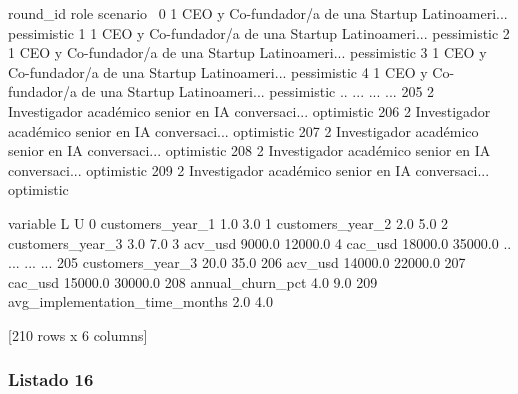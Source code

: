 \begin{APACode}
     round_id                                               role     scenario  \
0           1  CEO y Co-fundador/a de una Startup Latinoameri...  pessimistic   
1           1  CEO y Co-fundador/a de una Startup Latinoameri...  pessimistic   
2           1  CEO y Co-fundador/a de una Startup Latinoameri...  pessimistic   
3           1  CEO y Co-fundador/a de una Startup Latinoameri...  pessimistic   
4           1  CEO y Co-fundador/a de una Startup Latinoameri...  pessimistic   
..        ...                                                ...          ...   
205         2  Investigador académico senior en IA conversaci...   optimistic   
206         2  Investigador académico senior en IA conversaci...   optimistic   
207         2  Investigador académico senior en IA conversaci...   optimistic   
208         2  Investigador académico senior en IA conversaci...   optimistic   
209         2  Investigador académico senior en IA conversaci...   optimistic   

                           variable        L        U  
0                  customers_year_1      1.0      3.0  
1                  customers_year_2      2.0      5.0  
2                  customers_year_3      3.0      7.0  
3                           acv_usd   9000.0  12000.0  
4                           cac_usd  18000.0  35000.0  
..                              ...      ...      ...  
205                customers_year_3     20.0     35.0  
206                         acv_usd  14000.0  22000.0  
207                         cac_usd  15000.0  30000.0  
208                annual_churn_pct      4.0      9.0  
209  avg_implementation_time_months      2.0      4.0  

[210 rows x 6 columns]
\end{APACode}

\subsubsection{Listado 16}
\label{anexo:code-6-3-2-16}

